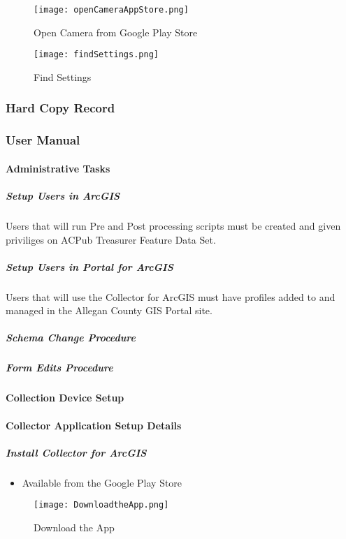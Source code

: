 \documentclass[class=article , crop=false, titlepage, twoside, multi={itemize, figure, verbatim}, float=false]{standalone}
\begin{document}
\begin{figure}[h!]
\centering
\texttt{[image: openCameraAppStore.png]}
\caption{Open Camera from Google Play Store}
\end{figure}

\begin{figure}[h!]
\centering
\texttt{[image: findSettings.png]}
\caption{Find Settings}
\end{figure}


\clearpage
\subsubsection{Hard Copy Record}

\clearpage
\subsubsection{User Manual}

\paragraph{Administrative Tasks}

\subparagraph{Setup Users in ArcGIS}Users that will run Pre and Post processing scripts must be created and given priviliges on ACPub Treasurer Feature Data Set.

\subparagraph{Setup Users in Portal for ArcGIS}Users that will use the Collector for ArcGIS must have profiles added to and managed in the Allegan County GIS Portal site.

\subparagraph{Schema Change Procedure}

\subparagraph{Form Edits Procedure}

\clearpage
\paragraph{Collection Device Setup}

\paragraph{Collector Application Setup Details}

\subparagraph{Install Collector for ArcGIS}
\begin{itemize}
\item Available from the Google Play Store
\end{itemize}
\begin{figure}[h!]
\centering
    \texttt{[image: DownloadtheApp.png]}
\caption{Download the App}
\end{figure}
\end{document}
